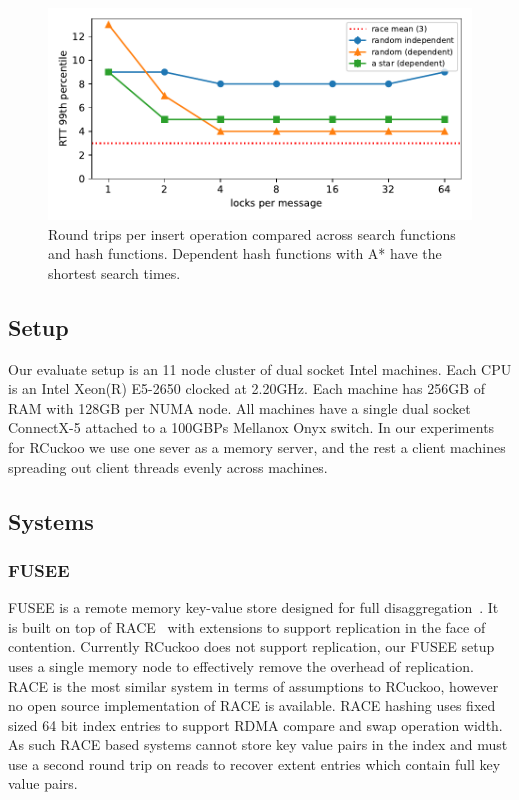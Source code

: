 \begin{figure}[ht]
    \includegraphics[width=0.99\linewidth]{fig/search_dependence.pdf}

    \caption{Round trips per insert operation compared
    across search functions and hash functions. Dependent
    hash functions with A* have the shortest search
    times.~}

    \label{fig:search_dependence}
\end{figure}

\subsection{Setup}

Our evaluate setup is an 11 node cluster of dual socket
Intel machines. Each CPU is an Intel Xeon(R) E5-2650 clocked
at 2.20GHz. Each machine has 256GB of RAM with 128GB per
NUMA node. All machines have a single dual socket ConnectX-5
attached to a 100GBPs Mellanox Onyx switch. In our
experiments for RCuckoo we use one sever as a memory server,
and the rest a client machines spreading out client threads
evenly across machines.

\subsection{Systems}

\subsubsection{FUSEE}

FUSEE is a remote memory key-value store designed for full
disaggregation~\cite{fusee}.  It is built on top of
RACE~\cite{race} with extensions to support replication in
the face of contention.  Currently RCuckoo does not support
replication, our FUSEE setup uses a single memory node to
effectively remove the overhead of replication. RACE is the
most similar system in terms of assumptions to RCuckoo,
however no open source implementation of RACE is available.
RACE hashing uses fixed sized 64 bit index entries to
support RDMA compare and swap operation width. As such RACE
based systems cannot store key value pairs in the index and
must use a second round trip on reads to recover extent
entries which contain full key value pairs.

